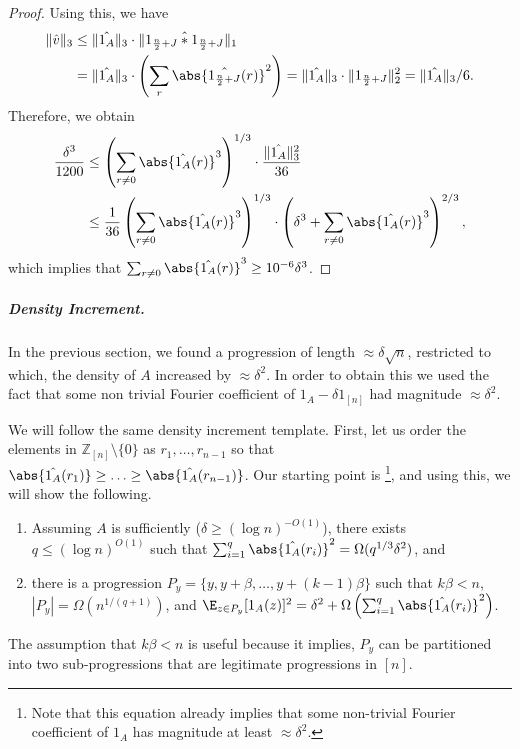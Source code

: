\documentclass{article}
\begin{document}
\begin{proof}
Using this, we have
\begin{align*}
\|\hat{v}\|_3 &\leq \|\hat{1_A}\|_3\cdot\|\hat{1_{\frac{n}{2}+J}\ast1_{\frac{n}{2}+J}}\|_1 \\
&= \|\hat{1_A}\|_3\cdot\left(\sum_{r}\abs{\hat{1_{\frac{n}{2}+J}}(r)}^2\right) = \|\hat{1_A}\|_3\cdot\|1_{\frac{n}{2}+J}\|_2^2 = \|\hat{1_A}\|_3/6.
\end{align*}
Therefore, we obtain
\begin{align*}
\frac{\delta^3}{1200} &\leq \left(\sum_{r\neq 0} \abs{\hat{1_A}(r)}^3\right)^{1/3}\cdot
\frac{\|\hat{1_A}\|_3^{2}}{36} \\
&\leq \frac{1}{36}\left(\sum_{r\neq 0}\abs{\hat{1_A}(r)}^3\right)^{1/3}\cdot\left(\delta^3 + \sum_{r\neq 0} \abs{\hat{1_A}(r)}^3\right)^{2/3},
\end{align*}
which implies that $\sum_{r\neq 0} \abs{\hat{1_A}(r)}^3 \geq 10^{-6}\delta^3$.
\end{proof}

\subparagraph*{Density Increment.} In the previous section, we found a progression of length $\approx \delta\sqrt{n}$, restricted to which, the density of $A$ increased by $\approx \delta^2$. In order to obtain this we used the fact that some non trivial Fourier coefficient of $1_{A} -\delta 1_{[n]}$ had magnitude $\approx \delta^2$. 

We will follow the same density increment template. First, let us order the elements in $\mathbb{Z}_{[n]}\setminus \{0\}$ as $r_1,\ldots,r_{n-1}$ so that $\abs{\hat{1_A}(r_1)} \geq \ldots \geq \abs{\hat{1_A}(r_{n-1})}$.
Our starting point is \footnote{Note that this equation already implies that some non-trivial Fourier coefficient of $1_A$ has magnitude at least $\approx \delta^2$.}, and using this, we will show the following.  
\begin{enumerate}
    \item Assuming $A$ is sufficiently ($\delta \geq (\log n)^{-O(1)}$), there exists $q \leq (\log n)^{O(1)}$ such that $\sum_{i=1}^{q}\abs{\hat{1_{A}}(r_i)}^2 = \Omega(q^{1/3}\delta^2)$, and 
    \item there is a progression $P_y = \{y,y+\beta,\ldots,y+(k-1)\beta\}$ such that $k\beta < n$, $|P_y| = \Omega(n^{1/(q+1)})$, and $\E_{z\in P_y}[1_{A}(z)]^2 = \delta^2 + \Omega\left(\sum_{i=1}^{q}\abs{\hat{1_{A}}(r_i)}^2\right)$.
\end{enumerate}

The assumption that $k\beta < n$ is useful because it implies, $P_y$ can be partitioned into two sub-progressions that are legitimate progressions in $[n]$.
\end{document}
